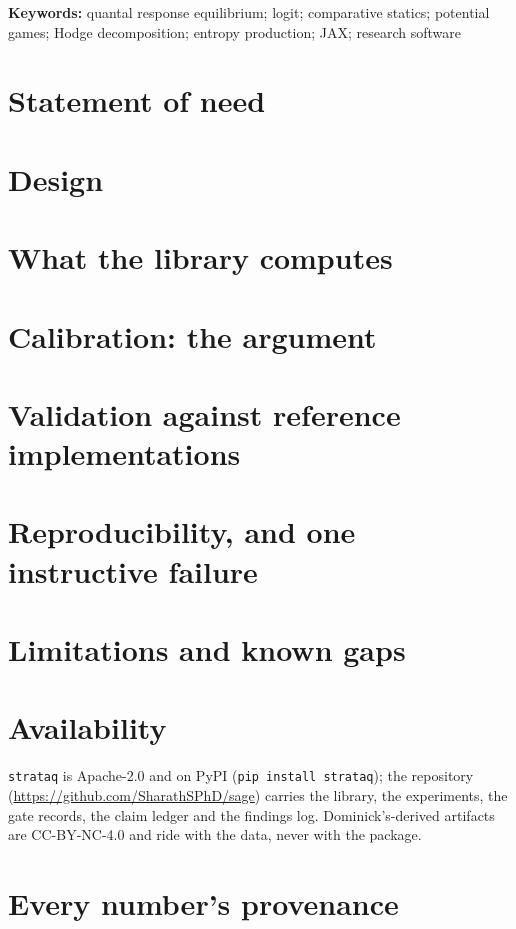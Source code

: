 \documentclass[11pt]{article}
\newcommand{\strataq}{\texttt{strataq}}
\begin{document}
\noindent\textbf{Keywords:} quantal response equilibrium; logit; comparative
statics; potential games; Hodge decomposition; entropy production; JAX;
research software

\section{Statement of need}

\section{Design}

\section{What the library computes}

\section{Calibration: the argument}

\section{Validation against reference implementations}

\section{Reproducibility, and one instructive failure}

\section{Limitations and known gaps}


\section*{Availability}
\strataq{} is Apache-2.0 and on PyPI (\texttt{pip install strataq}); the
repository (\url{https://github.com/SharathSPhD/sage}) carries the library, the
experiments, the gate records, the claim ledger and the findings log.
Dominick's-derived artifacts are CC-BY-NC-4.0 and ride with the data, never
with the package.

\appendix
\section{Every number's provenance}

\end{document}
